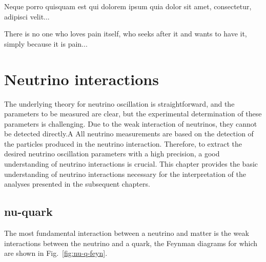 \begin{savequote}[8cm]
\textlatin{Neque porro quisquam est qui dolorem ipsum quia dolor sit amet, consectetur, adipisci velit...}

There is no one who loves pain itself, who seeks after it and wants to have it, simply because it is pain...
\end{savequote}

\chapter{\label{ch:35-nuint}Neutrino interactions} 
\minitoc
The underlying theory for neutrino oscillation is straightforward, and the parameters to be measured are clear, but the experimental determination of these parameters is challenging.
Due to the weak interaction of neutrinos, they cannot be detected directly.A
All neutrino measurements are based on the detection of the particles produced in the neutrino interaction.
Therefore, to extract the desired neutrino oscillation parameters with a high precision, a good understanding of neutrino interactions is crucial.
This chapter provides the basic understanding of neutrino interactions necessary for the interpretation of the analyses presented in the subsequent chapters.

\section{nu-quark}
The most fundamental interaction between a neutrino and matter is the weak interactions between the neutrino and a quark, the Feynman diagrams for which are shown in Fig.~\ref{fig:nu-q-feyn}.

